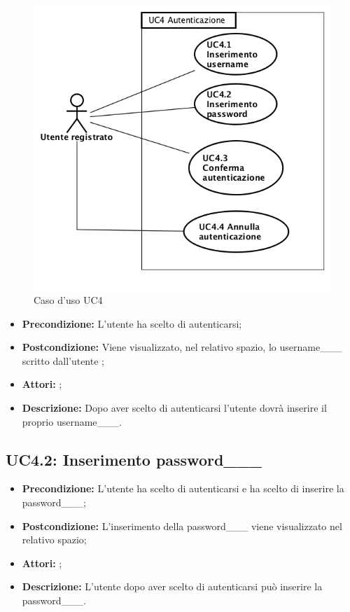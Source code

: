 \begin{figure}[h]
	\begin{center}
	\includegraphics[scale=0.4]{diagram/UC4.png}
	\caption{Caso d'uso UC4}
	\end{center}
\end{figure}
\begin{itemize}
	\item \textbf{Precondizione:} L'utente ha scelto di autenticarsi;
	\item \textbf{Postcondizione:} Viene visualizzato, nel relativo spazio, lo username___ scritto dall'utente ;
	\item \textbf{Attori:} ;
	\item \textbf{Descrizione:} Dopo aver scelto di autenticarsi l'utente dovrà inserire il proprio username___.
\end{itemize}
\subsection{ UC4.2: Inserimento password___}

\begin{itemize}
	\item \textbf{Precondizione:} L'utente ha scelto di autenticarsi e ha scelto di inserire la password___;
	\item \textbf{Postcondizione:} L'inserimento della password___ viene visualizzato nel relativo spazio;
	\item \textbf{Attori:} ;
	\item \textbf{Descrizione:} L'utente dopo aver scelto di autenticarsi può inserire la password___.
\end{itemize}
